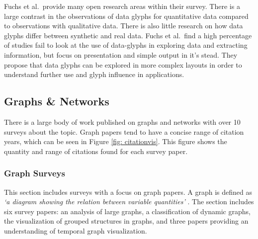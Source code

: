 
Fuchs et al.\ provide many open research areas within their survey. There is a large contrast in the observations of data glyphs for quantitative data compared to observations with qualitative data. There is also little research on how data glyphs differ between synthetic and real data. Fuchs et al.\ find a high percentage of studies fail to look at the use of data-glyphs in exploring data and extracting information, but focus on presentation and simple output in it's stead. They propose that data glyphs can be explored in more complex layouts in order to understand further use and glyph influence in applications.

\subsection{Graphs \& Networks}
There is a large body of work published on graphs and networks with over 10 surveys about the topic. Graph papers tend to have a concise range of citation years, which can be seen in Figure \ref{fig: citationvis}. This figure shows the quantity and range of citations found for each survey paper.


\subsubsection{Graph Surveys}
This section includes surveys with a focus on graph papers. A graph is defined as \textit{`a diagram showing the relation between variable quantities'} \cite{sedig2016design}. The section includes six survey papers: an analysis of large graphs, a classification of dynamic graphs, the visualization of grouped structures in graphs, and three papers providing an understanding of temporal graph visualization.

